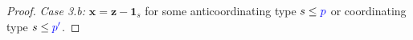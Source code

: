\documentclass[10 pt,twocolumn,journal]{IEEEtran}
\DeclarePairedDelimiter{\ceil}{\lceil}{\rceil}
\DeclarePairedDelimiter{\floor}{\lfloor}{\rfloor}
\theoremstyle{plain}
\newcommand{\A}{\mathcal{A}}
\newcommand{\I}{\mathcal{I}}
\newcommand{\R}{\mathcal{R}}
\renewcommand{\L}{\mathcal{L}}
\newcommand{\x}{\bm{x}}
\newcommand{\y}{\bm{y}}
\newcommand{\z}{\bm{z}}
\newcommand{\p}{\tb{p}}
\newcommand{\pp}{\tb{p'}}
\newcommand{\q}{\tr{q}}
\newcommand{\qq}{\tr{q'}}
\newcommand{\e}{\mathtt{e}}
\renewcommand{\A}{\mathtt{A}}
\newcommand{\B}{\mathtt{B}}
\newcommand{\tb}{\textcolor{blue}}
\newcommand{\tr}{\textcolor{Myred}}
\theoremstyle{definition}
\begin{document}
\begin{proof}
\emph{Case 3.b:} 
$\x = \z - \bm{1}_s$ for some anticoordinating type $s\leq \p$ or coordinating type $s\leq\pp$.  

\end{proof}
\end{document}
